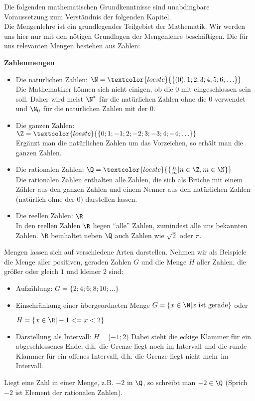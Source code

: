 Die folgenden mathematischen Grundkenntnisse sind unabdingbare Voraussetzung zum Verständnis der folgenden Kapitel.\\
Die Mengenlehre ist ein grundlegendes Teilgebiet der Mathematik. Wir werden uns hier nur mit den nötigen Grundlagen der Mengenlehre beschäftigen. Die für uns relevanten Mengen bestehen aus Zahlen:
\begin{tcolorbox}
	\textbf{Zahlenmengen}
	\begin{itemize}
		\item Die natürlichen Zahlen: \({\N=\textcolor{loestc}{\{(0), 1; 2; 3; 4; 5; 6; \ldots\}}}\)\\Die Mathematiker können sich nicht einigen, ob die 0 mit eingeschlossen sein soll. Daher wird meist $\N^*$ für die natürlichen Zahlen ohne die 0 verwendet und \(\N_0\) für die natürlichen Zahlen mit der 0.
		\item Die ganzen Zahlen: \({\Z=\textcolor{loestc}{\{0; 1; -1; 2; -2; 3; -3; 4; -4;\ldots\}}}\)\\Ergänzt man die natürlichen Zahlen um das Vorzeichen, so erhält man die ganzen Zahlen.
		\item Die rationalen Zahlen: \({\Q=\textcolor{loestc}{\{\frac{n}{m}|n\in\Z, m\in\N\}}}\)\\Die rationalen Zahlen enthalten alle Zahlen, die sich als Brüche mit einem Zähler aus den ganzen Zahlen und einem Nenner aus den natürlichen Zahlen (natürlich ohne der 0) darstellen lassen.
		\item Die reellen Zahlen: \(\R\)\\In den reellen Zahlen \(\R\) liegen "`alle"' Zahlen, zumindest alle uns bekannten Zahlen. \(\R\) beinhaltet neben \(\Q\) auch Zahlen wie \(\sqrt{2}\) oder \(\pi\).
	\end{itemize}
\end{tcolorbox}
Mengen lassen sich auf verschiedene Arten darstellen. Nehmen wir als Beispiele die Menge aller positiven, geraden Zahlen $G$ und die Menge $H$ aller Zahlen, die größer oder gleich $1$ und kleiner $2$ sind:
\begin{itemize}
	\item Aufzählung: ${G=\{2; 4; 6; 8; 10;\ldots \}}$
	\item Einschränkung einer übergeordneten Menge ${G=\{x\in\N|x\text{ ist gerade}\}}$ oder

	${H=\{x\in\R|-1<=x<2\}}$
	\item Darstellung als Intervall: $H=[-1;2)$ Dabei steht die eckige Klammer für ein abgeschlossenes Ende, d.h. die Grenze liegt noch im Intervall und die runde Klammer für ein offenes Intervall, d.h. die Grenze liegt nicht mehr im Intervall.
\end{itemize}
Liegt eine Zahl in einer Menge, z.B. $-2$ in $\Q$, so schreibt man ${-2\in\Q}$ (Sprich $-2$ ist Element der rationalen Zahlen).